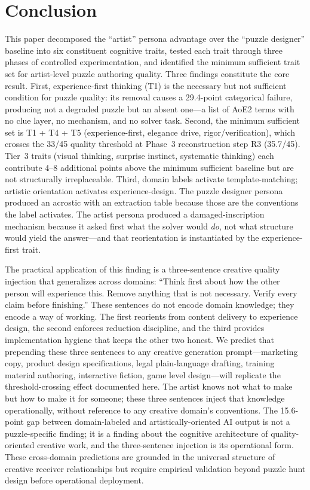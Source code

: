 \section{Conclusion}
\label{sec:conclusion}

This paper decomposed the ``artist'' persona advantage over the ``puzzle designer'' baseline into six constituent cognitive traits, tested each trait through three phases of controlled experimentation, and identified the minimum sufficient trait set for artist-level puzzle authoring quality. Three findings constitute the core result. First, experience-first thinking (T1) is the necessary but not sufficient condition for puzzle quality: its removal causes a 29.4-point categorical failure, producing not a degraded puzzle but an absent one---a list of AoE2 terms with no clue layer, no mechanism, and no solver task. Second, the minimum sufficient set is T1 + T4 + T5 (experience-first, elegance drive, rigor/verification), which crosses the 33/45 quality threshold at Phase~3 reconstruction step R3 (35.7/45). Tier~3 traits (visual thinking, surprise instinct, systematic thinking) each contribute 4--8 additional points above the minimum sufficient baseline but are not structurally irreplaceable. Third, domain labels activate template-matching; artistic orientation activates experience-design. The puzzle designer persona produced an acrostic with an extraction table because those are the conventions the label activates. The artist persona produced a damaged-inscription mechanism because it asked first what the solver would \emph{do}, not what structure would yield the answer---and that reorientation is instantiated by the experience-first trait.

The practical application of this finding is a three-sentence creative quality injection that generalizes across domains: ``Think first about how the other person will experience this. Remove anything that is not necessary. Verify every claim before finishing.'' These sentences do not encode domain knowledge; they encode a way of working. The first reorients from content delivery to experience design, the second enforces reduction discipline, and the third provides implementation hygiene that keeps the other two honest. We predict that prepending these three sentences to any creative generation prompt---marketing copy, product design specifications, legal plain-language drafting, training material authoring, interactive fiction, game level design---will replicate the threshold-crossing effect documented here. The artist knows not what to make but how to make it for someone; these three sentences inject that knowledge operationally, without reference to any creative domain's conventions. The 15.6-point gap between domain-labeled and artistically-oriented AI output is not a puzzle-specific finding; it is a finding about the cognitive architecture of quality-oriented creative work, and the three-sentence injection is its operational form. These cross-domain predictions are grounded in the universal structure of creative receiver relationships but require empirical validation beyond puzzle hunt design before operational deployment.

